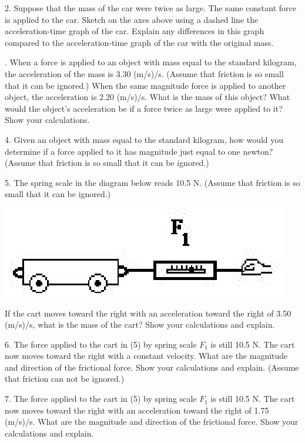 2. Suppose that the mass of the car were twice as large. The same constant force
is applied to the car. Sketch on the axes above using a dashed line the acceleration-time
graph of the car. Explain any differences in this graph compared to the acceleration-time
graph of the car with the original mass.
\answerspace{10mm}

. When a force is applied to an object with mass equal to the standard kilogram,
the acceleration of the mass is 3.30 (m/s)/s. (Assume that friction is so small
that it can be ignored.) When the same magnitude force is applied to another
object, the acceleration is 2.20 (m/s)/s. What is the mass of this object? What
would the object's acceleration be if a force twice as large were applied to
it? Show your calculations.
\answerspace{20mm}

4. Given an object with mass equal to the standard kilogram, how would you determine
if a force applied to it has magnitude just equal to one newton? (Assume that
friction is so small that it can be ignored.)
\answerspace{20mm}

5. The spring scale in the diagram below reads 10.5 N. (Assume that friction
is so small that it can be ignored.)

{\par\centering \includegraphics{combining/combining_fig2.eps} \par}

If the cart moves toward the right with an acceleration toward the right of
3.50 (m/s)/s, what is the mass of the cart? Show your calculations and explain.
\answerspace{20mm}

6. The force applied to the cart in (5) by spring scale \( F_{1} \) is still
10.5 N. The cart now moves toward the right with a constant velocity. What are
the magnitude and direction of the frictional force. Show your calculations
and explain. (Assume that friction can not be ignored.)
\answerspace{20mm}

7. The force applied to the cart in (5) by spring scale \( F_{1} \) is still
10.5 N. The cart now moves toward the right with an acceleration toward the
right of 1.75 (m/s)/s. What are the magnitude and direction of the frictional
force. Show your calculations and explain.
\answerspace{20mm}

